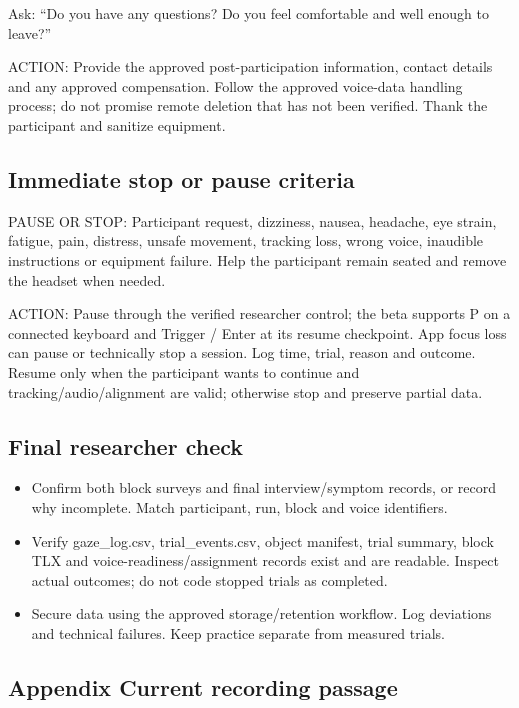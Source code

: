 Ask: ``Do you have any questions? Do you feel comfortable and well
enough to leave?''

ACTION: Provide the approved post-participation information, contact
details and any approved compensation. Follow the approved voice-data
handling process; do not promise remote deletion that has not been
verified. Thank the participant and sanitize equipment.

\subsection{Immediate stop or pause
criteria}\label{immediate-stop-or-pause-criteria}

PAUSE OR STOP: Participant request, dizziness, nausea, headache, eye
strain, fatigue, pain, distress, unsafe movement, tracking loss, wrong
voice, inaudible instructions or equipment failure. Help the participant
remain seated and remove the headset when needed.

ACTION: Pause through the verified researcher control; the beta supports
P on a connected keyboard and Trigger / Enter at its resume checkpoint.
App focus loss can pause or technically stop a session. Log time, trial,
reason and outcome. Resume only when the participant wants to continue
and tracking/audio/alignment are valid; otherwise stop and preserve
partial data.

\subsection{Final researcher check}\label{final-researcher-check}

\begin{itemize}
\item
  Confirm both block surveys and final interview/symptom records, or
  record why incomplete. Match participant, run, block and voice
  identifiers.
\item
  Verify gaze\_log.csv, trial\_events.csv, object manifest, trial
  summary, block TLX and voice-readiness/\allowbreak assignment records exist and
  are readable. Inspect actual outcomes; do not code stopped trials as
  completed.
\item
  Secure data using the approved storage/retention workflow. Log
  deviations and technical failures. Keep practice separate from
  measured trials.
\end{itemize}

\subsection{Appendix Current recording
passage}\label{appendix-current-recording-passage}

